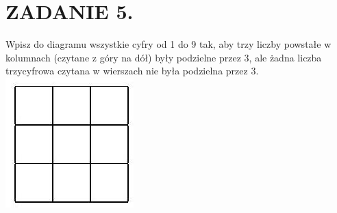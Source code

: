 \documentclass[10pt]{article}
\begin{document}
\section*{ZADANIE 5.}
Wpisz do diagramu wszystkie cyfry od 1 do 9 tak, aby trzy liczby powstałe w kolumnach (czytane z góry na dół) były podzielne przez 3, ale żadna liczba trzycyfrowa czytana w wierszach nie była podzielna przez 3.\\
\includegraphics[max width=\textwidth, center]{2024_11_21_1e8c4b47eb64ad7d9f09g-1}
\end{document}
